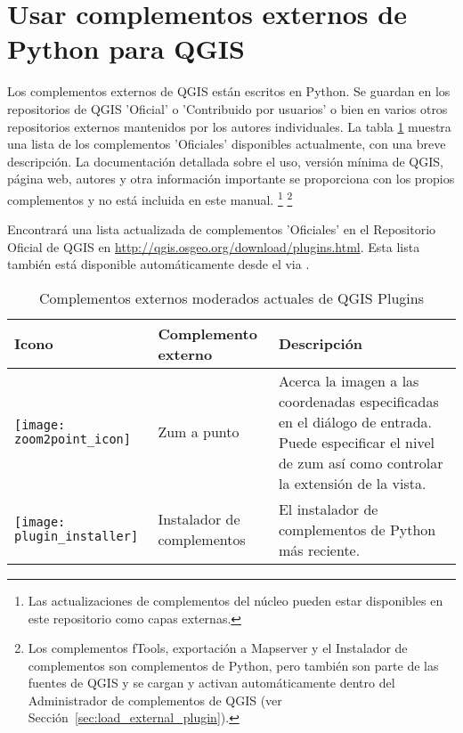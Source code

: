 
\section{Usar complementos externos de Python para QGIS}\label{sec:external_plugins}


Los complementos externos de QGIS están escritos en Python. Se guardan en los repositorios de QGIS
'Oficial' o 'Contribuido por usuarios' o bien en varios otros repositorios externos mantenidos por los autores individuales.
La tabla \ref{tab:external_plugins} muestra una lista de los complementos 'Oficiales' disponibles actualmente, con una breve descripción.
La documentación detallada sobre el uso, versión mínima de QGIS, página web, autores y otra información importante se
proporciona con los propios complementos y no está incluida en este manual.
\footnote{Las actualizaciones de complementos del núcleo pueden estar disponibles en este repositorio como capas externas.} 
\footnote{Los complementos fTools, exportación a Mapserver y el Instalador de complementos son complementos de Python, 
pero también son parte de las fuentes de QGIS y se cargan y activan automáticamente dentro del Administrador de complementos 
de QGIS (ver Sección~\ref{sec:load_external_plugin}).}

Encontrará una lista actualizada de complementos 'Oficiales' en el Repositorio Oficial de QGIS en
\url{http://qgis.osgeo.org/download/plugins.html}. Esta lista también está disponible automáticamente desde el 
 via .

\begin{table}[H]
\centering
\caption{Complementos externos moderados actuales de QGIS Plugins}\label{tab:external_plugins}\medskip
\small
 \begin{tabular}{|l|l|p{4in}|}
\hline \textbf{Icono} & \textbf{Complemento externo} & \textbf{Descripción}\\
\hline
\texttt{[image: zoom2point\_icon]}
 & Zum a punto \index{plugins!Zoom To Point} & Acerca la imagen a las coordenadas especificadas en el diálogo de 
entrada. Puede especificar el nivel de zum así como controlar la extensión de la vista.\\
\hline
\texttt{[image: plugin\_installer]}
 & Instalador de complementos \index{plugins!Plugin Installer} & El instalador de complementos de Python más reciente.\\
\hline

\end{tabular}
\end{table}

